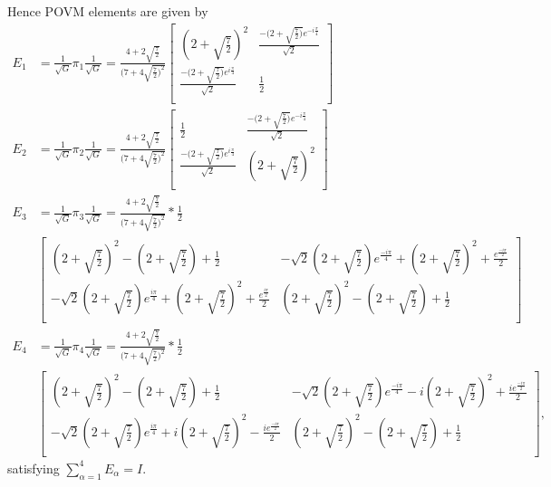 Hence POVM elements are given by
\begin{align*}
E_{1} & = \frac{1}{\sqrt{G}}\pi_{1}\frac{1}{\sqrt{G}} = \frac{4+2\sqrt{\frac{7}{2}}}{(7+4\sqrt{\frac{7}{2})^{2}}}
\begin{bmatrix}
(2+\sqrt{\frac{7}{2}})^{2} & \frac{-(2+\sqrt{\frac{7}{2})}e^{-i\frac{\pi}{4}}}{\sqrt{2}}  \\ 
\frac{-(2+\sqrt{\frac{7}{2})}e^{i\frac{\pi}{4}}}{\sqrt{2}} & \frac{1}{2}\\ 
\end{bmatrix}\\
E_{2} & = \frac{1}{\sqrt{G}}\pi_{2}\frac{1}{\sqrt{G}} = \frac{4+2\sqrt{\frac{7}{2}}}{(7+4\sqrt{\frac{7}{2})^{2}}}
\begin{bmatrix}
\frac{1}{2} & \frac{-(2+\sqrt{\frac{7}{2})}e^{-i\frac{\pi}{4}}}{\sqrt{2}}\\ 
\frac{-(2+\sqrt{\frac{7}{2})}e^{i\frac{\pi}{4}}}{\sqrt{2}} & (2+\sqrt{\frac{7}{2}})^{2}\\ 
\end{bmatrix}\\
E_{3} & = \frac{1}{\sqrt{G}}\pi_{3}\frac{1}{\sqrt{G}} = \frac{4+2\sqrt{\frac{7}{2}}}{(7+4\sqrt{\frac{7}{2})^{2}}}*\frac{1}{2}\\
&\begin{bmatrix}
(2+\sqrt{\frac{7}{2}})^{2}-(2+\sqrt{\frac{7}{2}})+\frac{1}{2} & -\sqrt{2}(2+\sqrt{\frac{7}{2}})e^{\frac{-i\pi}{4}}+(2+\sqrt{\frac{7}{2}})^{2}+\frac{e^{\frac{-i\pi}{2}}}{2} \\
-\sqrt{2}(2+\sqrt{\frac{7}{2}})e^{\frac{i\pi}{4}}+(2+\sqrt{\frac{7}{2}})^{2}+\frac{e^{\frac{i\pi}{2}}}{2} & (2+\sqrt{\frac{7}{2}})^{2}-(2+\sqrt{\frac{7}{2}})+\frac{1}{2}\\
\end{bmatrix}\\
E_{4} & = \frac{1}{\sqrt{G}}\pi_{4}\frac{1}{\sqrt{G}} = \frac{4+2\sqrt{\frac{7}{2}}}{(7+4\sqrt{\frac{7}{2})^{2}}}*\frac{1}{2}\\
&\begin{bmatrix}
(2+\sqrt{\frac{7}{2}})^{2}-(2+\sqrt{\frac{7}{2}})+\frac{1}{2} & -\sqrt{2}(2+\sqrt{\frac{7}{2}})e^{\frac{-i\pi}{4}}-i(2+\sqrt{\frac{7}{2}})^{2}+\frac{ie^{\frac{-i\pi}{2}}}{2} \\ 
-\sqrt{2}(2+\sqrt{\frac{7}{2}})e^{\frac{i\pi}{4}}+i(2+\sqrt{\frac{7}{2}})^{2}-\frac{ie^{\frac{-i\pi}{2}}}{2} & (2+\sqrt{\frac{7}{2}})^{2}-(2+\sqrt{\frac{7}{2}})+\frac{1}{2}\\
\end{bmatrix},
\end{align*}
satisfying $\sum_{\alpha=1}^{4} E_{\alpha}= I$.

